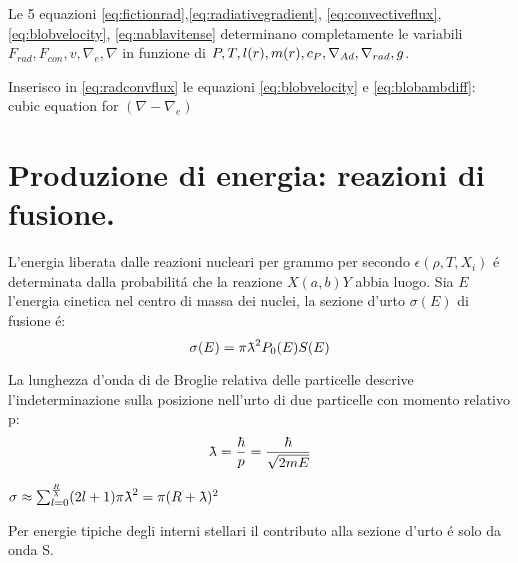 \documentclass[../main.tex]{subfiles}
\begin{document}
\begin{errata}

Le 5 equazioni \eqref{eq:fictionrad},\eqref{eq:radiativegradient}, \eqref{eq:convectiveflux}, \eqref{eq:blobvelocity}, \eqref{eq:nablavitense} determinano completamente le variabili $F_{rad}, F_{con}, v, \nabla_e, \nabla$ in funzione di $P,T,l(r),m(r),c_P,\nabla_{Ad}{},\nabla_{rad}{},g$.

\end{errata}

\begin{workout}

\end{workout}

\begin{workout}
Inserisco in \eqref{eq:radconvflux} le equazioni \eqref{eq:blobvelocity} e \eqref{eq:blobambdiff}: cubic equation for $(\nabla-\nabla_e)$
\end{workout}

{\let\clearpage\relax\let\cleardoublepage\relax
\chapter{Produzione di energia: reazioni di fusione.}
}

L'energia liberata dalle reazioni nucleari per grammo per secondo $\epsilon(\rho,T,X_i)$ \'e determinata dalla probabilit\'a che la reazione $X(a,b)Y$ abbia luogo. Sia $E$ l'energia cinetica nel centro di massa dei nuclei, la sezione d'urto $\sigma(E)$ di fusione \'e:
\begin{equation}
\sigma(E)=\pi\lambdabar^2P_0(E)S(E)
\end{equation}

La lunghezza d'onda di de Broglie relativa delle particelle descrive l'indeterminazione sulla posizione nell'urto di due particelle con momento relativo p:
\begin{equation}
\lambdabar=\frac{\hbar}{p}=\frac{\hbar}{\sqrt{2mE}}
\end{equation}

\begin{workout}
$\sigma\approx\sum_{l=0}^{\frac{R}{\lambdabar}}(2l+1)\pi\lambdabar^2=\pi(R+\lambdabar)^2$

Per energie tipiche degli interni stellari il contributo alla sezione d'urto \'e solo da onda S.

\end{workout}
\end{document}
